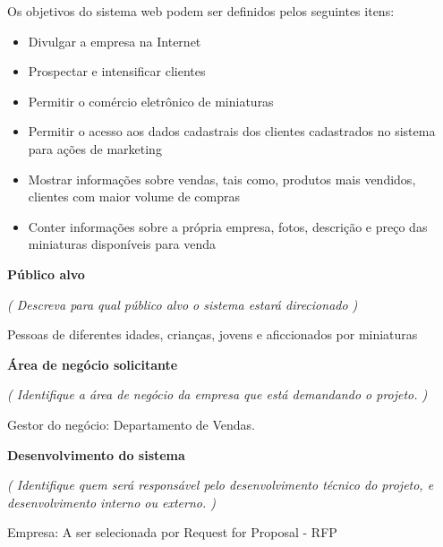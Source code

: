 Os objetivos do sistema web podem ser definidos pelos seguintes itens:

\begin{itemize}
    \item Divulgar a empresa na Internet
    \item Prospectar e intensificar clientes
    \item Permitir o comércio eletrônico de miniaturas
    \item Permitir o acesso aos dados cadastrais dos clientes cadastrados no sistema para ações de marketing
    \item Mostrar informações sobre vendas, tais como, produtos mais vendidos, clientes com maior volume de compras
    \item Conter informações sobre a própria empresa, fotos, descrição e preço das miniaturas disponíveis para venda
\end{itemize}


\vskip 0.4cm
{\fontsize{18pt}{18pt} \selectfont \bf Público alvo}
\vskip 0.2cm

\textit{ ( Descreva para qual público alvo o sistema estará direcionado ) }

Pessoas de diferentes idades, crianças, jovens e aficcionados por miniaturas


\vskip 0.4cm
{\fontsize{18pt}{18pt} \selectfont \bf Área de negócio solicitante}
\vskip 0.2cm

\textit{ ( Identifique a área de negócio da empresa que está demandando o projeto. ) }

Gestor do negócio: Departamento de Vendas.


\vskip 0.4cm
{\fontsize{18pt}{18pt} \selectfont \bf Desenvolvimento do sistema}
\vskip 0.2cm

\textit{ ( Identifique quem será responsável pelo desenvolvimento técnico do projeto, e desenvolvimento interno ou externo. ) }

Empresa: A ser selecionada por Request for Proposal - RFP


